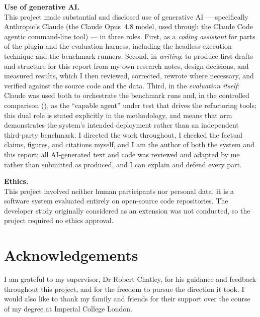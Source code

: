 \documentclass[11pt,a4paper]{report}
\begin{document}
\vspace{1em}
\noindent\textbf{Use of generative AI.}\\
This project made substantial and disclosed use of generative AI --- specifically
Anthropic's Claude (the Claude Opus~4.8 model, used through the Claude Code agentic
command-line tool) --- in three roles. First, as a \emph{coding assistant} for parts of
the plugin and the evaluation harness, including the headless-execution technique and
the benchmark runners. Second, in \emph{writing}: to produce first drafts and structure
for this report from my own research notes, design decisions, and measured results,
which I then reviewed, corrected, rewrote where necessary, and verified against the
source code and the data. Third, in the \emph{evaluation itself}: Claude was used both
to orchestrate the benchmark runs and, in the controlled comparison
(), as the ``capable agent'' under test that drives the
refactoring tools; this dual role is stated explicitly in the methodology, and means
that arm demonstrates the system's intended deployment rather than an independent
third-party benchmark. I directed the work throughout, I checked the factual claims,
figures, and citations myself, and I am the author of both the system and this report;
all AI-generated text and code was reviewed and adapted by me rather than submitted as
produced, and I can explain and defend every part.

\vspace{1em}
\noindent\textbf{Ethics.}\\
This project involved neither human participants nor personal data: it is a software
system evaluated entirely on open-source code repositories. The developer study
originally considered as an extension was not conducted, so the project required no
ethics approval.

\chapter*{Acknowledgements}
I am grateful to my supervisor, Dr Robert Chatley, for his guidance and feedback
throughout this project, and for the freedom to pursue the direction it took. I
would also like to thank my family and friends for their support over the course
of my degree at Imperial College London.
\end{document}
